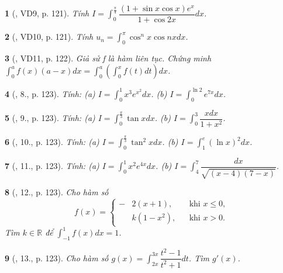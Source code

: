 \documentclass{article}
\newtheorem{baitoan}{}
\begin{document}
\begin{baitoan}[\cite{TLCT_giai_tich_12}, VD9, p. 121]
	Tính $I = \int_0^{\frac{\pi}{4}} \dfrac{(1 + \sin x\cos x)e^x}{1 + \cos2x}dx$.
\end{baitoan}

\begin{baitoan}[\cite{TLCT_giai_tich_12}, VD10, p. 121]
	Tính $u_n = \int_0^\pi \cos^nx\cos nxdx$.
\end{baitoan}

\begin{baitoan}[\cite{TLCT_giai_tich_12}, VD11, p. 122]
	Giả sử f là hàm liên tục. Chứng minh $\int_0^a f(x)(a - x)dx = \int_0^a\left(\int_0^x f(t)dt\right)dx$.
\end{baitoan}

\begin{baitoan}[\cite{TLCT_giai_tich_12}, 8., p. 123]
	Tính: (a) $I = \int_0^1 x^3e^{x^2}dx$. (b) $I = \int_0^{\ln2} e^{7x}dx$.
\end{baitoan}

\begin{baitoan}[\cite{TLCT_giai_tich_12}, 9., p. 123]
	Tính: (a) $I = \int_0^{\frac{\pi}{3}} \tan xdx$. (b) $I = \int_0^3 \dfrac{xdx}{1 + x^2}$.
\end{baitoan}

\begin{baitoan}[\cite{TLCT_giai_tich_12}, 10., p. 123]
	Tính: (a) $I = \int_0^{\frac{\pi}{3}} \tan^2xdx$. (b) $I = \int_1^e (\ln x)^2dx$.
\end{baitoan}

\begin{baitoan}[\cite{TLCT_giai_tich_12}, 11., p. 123]
	Tính: (a) $I = \int_0^1 x^2e^{4x}dx$. (b) $I = \int_4^7 \dfrac{dx}{\sqrt{(x - 4)(7 - x)}}$.
\end{baitoan}

\begin{baitoan}[\cite{TLCT_giai_tich_12}, 12., p. 123]
	Cho hàm số
	\begin{equation*}
		f(x) = \left\{\begin{split}
			-&2(x + 1),&&\mbox{khi } x\le0,\\
			&k(1 - x^2),&&\mbox{khi } x > 0.
		\end{split}\right.
	\end{equation*}
	Tìm $k\in\mathbb{R}$ để $\int_{-1}^1 f(x)dx = 1$.
\end{baitoan}

\begin{baitoan}[\cite{TLCT_giai_tich_12}, 13., p. 123]
	Cho hàm số $g(x) = \int_{2x}^{3x} \dfrac{t^2 - 1}{t^2 + 1}dt$. Tìm $g'(x)$.
\end{baitoan}
\end{document}
